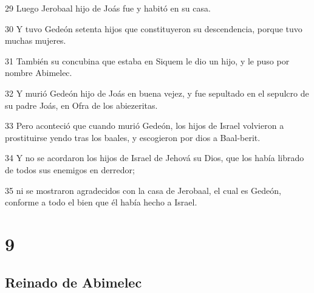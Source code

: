 \par 29 Luego Jerobaal hijo de Joás fue y habitó en su casa.
\par 30 Y tuvo Gedeón setenta hijos que constituyeron su descendencia, porque tuvo muchas mujeres.
\par 31 También su concubina que estaba en Siquem le dio un hijo, y le puso por nombre Abimelec.
\par 32 Y murió Gedeón hijo de Joás en buena vejez, y fue sepultado en el sepulcro de su padre Joás, en Ofra de los abiezeritas.
\par 33 Pero aconteció que cuando murió Gedeón, los hijos de Israel volvieron a prostituirse yendo tras los baales, y escogieron por dios a Baal-berit.
\par 34 Y no se acordaron los hijos de Israel de Jehová su Dios, que los había librado de todos sus enemigos en derredor;
\par 35 ni se mostraron agradecidos con la casa de Jerobaal, el cual es Gedeón, conforme a todo el bien que él había hecho a Israel.

\chapter{9}

\section*{Reinado de Abimelec}

